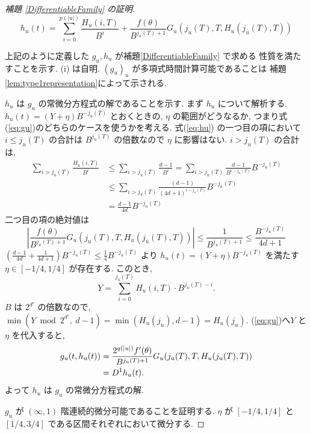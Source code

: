\begin{proof}[\rm 補題 \ref{DifferentiableFamily} の証明]
 \begin{equation} 
  h_u(t) = \sum^{p(|u|)}_{i=0} \frac{H_u(i, T)}{B^i}  
  + \frac{f(\theta)}{B^{j_u(T)+1}} G_u(j_u(T), T, H_u(j_u(T), T)) 
  \label{eq:hu}
 \end{equation}

 上記のように定義した $g_u, h_u$ が補題\ref{DifferentiableFamily} で求める
 性質を満たすことを示す. (i) は自明. 
 $(g_u)_u$ が多項式時間計算可能であることは
 補題 \ref{lem:type1representation}によって示される.

 $h_u$ は $g_u$ の常微分方程式の解であることを示す.
 まず $h_u$ について解析する. 
  $h_u(t) = (Y + \eta) B^{-j_u(T)}$ とおくときの, $\eta$ の範囲がどうなるか,
  つまり式(\ref{eq:gu})のどちらのケースを使うかを考える.
  式(\ref{eq:hu}) の一つ目の項において
 $i \le j_u(T)$ の合計は $B^{j_u(T)}$ の倍数なので $\eta$ に影響はない.
  $i > j_u(T)$ の合計は, 
 \begin{align*}
  \sum_{i>j_u(T)} \frac{H_u(i, T)}{B^i} 
  & \le \sum_{i>j_u(T)} \frac{d-1}{B^i} 
   = \sum_{i>j_u(T)} \frac{d-1}{B^{i-j_u(T)}}B^{-j_u(T)} \\
  & \le \sum_{i>j_u(T)} \frac{(d-1)}{(4d+1)^{i-j_u(T)}}B^{-j_u(T)} \\
  & = \frac{d-1}{4d}B^{-j_u(T)}
 \end{align*}
 二つ目の項の絶対値は
 \begin{equation}
  \left| \frac{f(\theta)}{B^{j_u(T)+1}} G_u(j_u(T), T, H_u(j_u(T), T)) \right|
  \le \frac{1}{B^{j_u(T)+1}}
  \le \frac{B^{-j_u(T)}}{4d+1}
 \end{equation}
 $(\frac{d-1}{4d} + \frac{1}{4d+1})B^{-j_u(T)} \le \frac 1 4 B^{-j_u(T)} $
  より $h_u(t) = (Y + \eta) B^{-j_u(T)}$ を満たす $\eta \in [-1/4, 1/4]$
 が存在する. このとき,
 \begin{equation}
  Y = \sum_{i=0}^{j_u(T)}H_u(i, T) \cdot B^{j_u(T) - i} .
 \end{equation}
 $B$ は $2^{d'}$ の倍数なので, 
 $\min (Y \bmod 2^{d'}\!\!\!,\ d-1) = \min (H_u(j_u), d-1) = H_u(j_u)$. 
 (\ref{eq:gu})へ$Y$ と $\eta$ を代入すると,
 \begin{align*}
   g_u(t, h_u(t)) 
  & =  \frac{2^{q(|u|)} f'(\theta)}{B^{j_u(T)+1}}
   G_u(j_u(T), T, H_u(j_u(T), T)) \\
  & =  D^{1}h_u(t).
 \end{align*}
 よって $h_u$ は $g_u$ の常微分方程式の解.

  $g_u$ が $(\infty, 1)$ 階連続的微分可能であることを証明する.
  $\eta$ が $[-1/4, 1/4]$ と $[1/4, 3/4]$ である区間それぞれにおいて微分する.


\end{proof}
